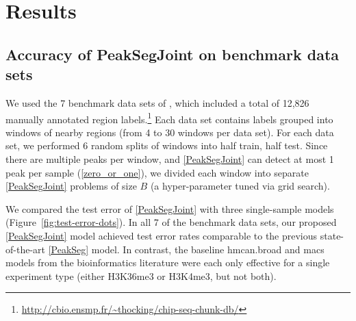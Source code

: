 \documentclass{article} %
\begin{document}

\section{Results}
\label{sec:results}

\subsection{Accuracy of PeakSegJoint on benchmark data sets}

We used the 7 benchmark data sets of
\citet{hocking2014visual}, which included a total of 12,826 manually
annotated
region labels.\footnote{\url{http://cbio.ensmp.fr/~thocking/chip-seq-chunk-db/}}
Each data set contains labels grouped into windows of nearby regions
(from 4 to 30 windows per data set). For each data set, we performed 6
random splits of windows into half train, half test. Since there are
multiple peaks per window, and \ref{PeakSegJoint} can detect at most 1
peak per sample (\ref{zero_or_one}), we divided each window into separate
\ref{PeakSegJoint} problems of size $B$ (a hyper-parameter tuned via
grid search).

We compared the test error of \ref{PeakSegJoint} with three
single-sample models (Figure~\ref{fig:test-error-dots}). In all 7 of
the benchmark data sets, our proposed \ref{PeakSegJoint} model
achieved test error rates comparable to the previous state-of-the-art
\ref{PeakSeg} model. In contrast, the baseline hmcan.broad
\citep{HMCan} and macs \citep{MACS} models from the bioinformatics
literature were each only effective for a single experiment type
(either H3K36me3 or H3K4me3, but not both).  

\end{document}
